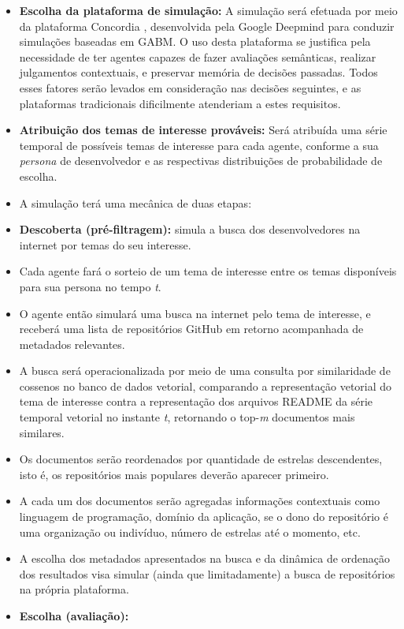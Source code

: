 \documentclass[12pt,oneside,a4paper,brazil,sumario=tradicional]{abntex2}
\begin{document}
\begin{itemize}
  \item \textbf{Escolha da plataforma de simulação:} A simulação será efetuada por meio da plataforma Concordia \cite{vezhnevets2023}, desenvolvida pela Google Deepmind para conduzir simulações baseadas em GABM. O uso desta plataforma se justifica pela necessidade de ter agentes capazes de fazer avaliações semânticas, realizar julgamentos contextuais, e preservar memória de decisões passadas. Todos esses fatores serão levados em consideração nas decisões seguintes, e as plataformas tradicionais dificilmente atenderiam a estes requisitos.
  \item \textbf{Atribuição dos temas de interesse prováveis:} Será atribuída uma série temporal de possíveis temas de interesse para cada agente, conforme a sua \textit{persona }de desenvolvedor e as respectivas distribuições de probabilidade de escolha.
  \item A simulação terá uma mecânica de duas etapas:
  \item \textbf{Descoberta (pré-filtragem):} simula a busca dos desenvolvedores na internet por temas do seu interesse.
  \item Cada agente fará o sorteio de um tema de interesse entre os temas disponíveis para sua persona no tempo \textit{t}.
  \item O agente então simulará uma busca na internet pelo tema de interesse, e receberá uma lista de repositórios GitHub em retorno acompanhada de metadados relevantes.
  \item A busca será operacionalizada por meio de uma consulta por similaridade de cossenos no banco de dados vetorial, comparando a representação vetorial do tema de interesse contra a representação dos arquivos README da série temporal vetorial no instante \textit{t}, retornando o top-\textit{m }documentos mais similares.
  \item Os documentos serão reordenados por quantidade de estrelas descendentes, isto é, os repositórios mais populares deverão aparecer primeiro.
  \item A cada um dos documentos serão agregadas informações contextuais como linguagem de programação, domínio da aplicação, se o dono do repositório é uma organização ou indivíduo, número de estrelas até o momento, etc.
  \item A escolha dos metadados apresentados na busca e da dinâmica de ordenação dos resultados visa simular (ainda que limitadamente) a busca de repositórios na própria plataforma.
  \item \textbf{Escolha (avaliação):}

\end{itemize}
\end{document}

